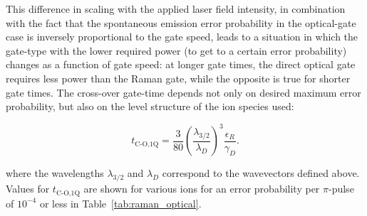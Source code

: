 \documentclass[%
12pt,
 amsmath,amssymb,
]{revtex4-2}
\begin{document}
This difference in scaling with the applied laser field intensity, in combination with the fact that the spontaneous emission error probability in the optical-gate case is inversely proportional to the gate speed, leads to a situation in which the gate-type with the lower required power (to get to a certain error probability) changes as a function of gate speed:  at longer gate times, the direct optical gate requires less power than the Raman gate, while the opposite is true for shorter gate times.  The cross-over gate-time depends not only on desired maximum error probability, but also on the level structure of the ion species used:

\begin{equation}
t_{\textrm{C-O,1Q}}=\frac{3}{80}\left( \frac{\lambda_{3/2}}{\lambda_{D}} \right)^{3} \frac{\epsilon_{R}}{\gamma_{D}}.
\end{equation}

\noindent where the wavelengths $\lambda_{3/2}$ and $\lambda_{D}$ correspond to the wavevectors defined above.  Values for $t_{\textrm{C-O,1Q}}$ are shown for various ions for an error probability per $\pi$-pulse of $10^{-4}$ or less in Table~\ref{tab:raman_optical}.

\end{document}
